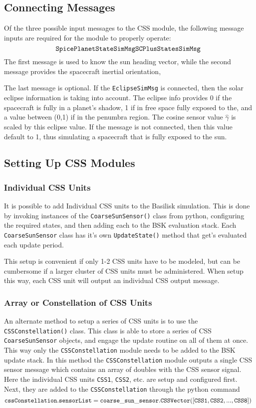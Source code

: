 \subsection{Connecting Messages}
Of the three possible input messages to the CSS module, the following message inputs are required for the module to properly operate:
$$
	{\tt SpicePlanetStateSimMsg} \\
	{\tt SCPlusStatesSimMsg}
$$
The first message is used to know the sun heading vector, while the second message provides the spacecraft inertial orientation,

The last message is optional.  If the {\tt EclipseSimMsg} is connected, then the solar eclipse information is taking into account.  The eclipse info provides 0 if the spacecraft is fully in a planet's shadow, 1 if in free space fully exposed to the, and a value between (0,1) if in the penumbra region.  The cosine sensor value $\hat\gamma$ is scaled by this eclipse value.  If the message is not connected, then this value default to 1, thus simulating a spacecraft that is fully exposed to the sun.  



\subsection{Setting Up CSS Modules}
\subsubsection{Individual CSS Units}
It is possible to add Individual CSS units to the Basilisk simulation.   This is done by invoking instances of the {\tt CoarseSunSensor()} class from python, configuring the required states, and then adding each to the BSK evaluation stack.  Each {\tt CoarseSunSensor} class has it's own {\tt UpdateState()} method that get's evaluated each update period.  

This setup is convenient if only 1-2 CSS units have to be modeled, but can be cumbersome if a larger cluster of CSS units must be administered.  When setup this way, each CSS unit will output an individual CSS output message.

\subsubsection{Array or Constellation of CSS Units}
An alternate method to setup a series of CSS units is to use the {\tt CSSConstellation()} class.  This class is able to store a series of CSS {\tt CoarseSunSensor} objects, and engage the update routine on all of them at once.  This way only the {\tt CSSConstellation} module needs to be added to the BSK update stack.  In this method the 
{\tt CSSConstellation} module outputs a single CSS sensor message which contains an array of doubles with the CSS sensor signal.  Here the individual CSS units {\tt CSS1}, {\tt CSS2}, etc. are setup and configured first.  Next, they are added to the {\tt CSSConstellation} through the python command
$$
	{\tt cssConstellation.sensorList = coarse\_sun\_sensor.CSSVector([CSS1, CSS2, ..., CSS8])}
$$

